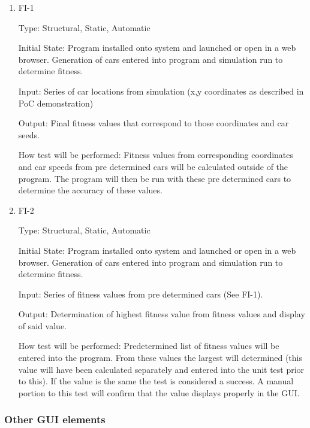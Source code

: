 \documentclass[12pt, titlepage]{article}
\begin{document}
\begin{enumerate}

\item{FI-1\\}

Type: Structural, Static, Automatic
					
Initial State: Program installed onto system and launched or open in a web 
browser. Generation of cars entered into program and simulation run to determine 
fitness.
					
Input: Series of car locations from simulation (x,y coordinates as described in PoC 
demonstration)
					
Output: Final fitness values that correspond to those coordinates and car seeds.
					
How test will be performed: Fitness values from corresponding coordinates and 
car speeds from pre determined cars will be calculated outside of the program. 
The program will then be run with these pre determined cars to determine the 
accuracy of these values. 
					
\item{FI-2\\}

Type: Structural, Static, Automatic
					
Initial State: Program installed onto system and launched or open in a web 
browser. Generation of cars entered into program and simulation run to determine 
fitness.
					
Input: Series of fitness values from pre determined cars (See FI-1).
					
Output: Determination of highest fitness value from fitness values and display 
of said value.
					
How test will be performed:  Predetermined list of fitness values will be 
entered into the program. From these values the largest will determined (this 
value will have been calculated separately and entered into the unit test prior 
to this). If the value is the same the test is considered a success. A manual 
portion to this test will confirm that the value displays properly in the GUI.

\end{enumerate}

\subsubsection{Other GUI elements}
\end{document}

